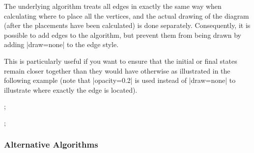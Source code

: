 \documentclass[a4paper,final]{ltxdoc}
\begin{document}
The underlying algorithm treats all edges in exactly the same way when
calculating where to place all the vertices, and the actual drawing of the
diagram (after the placements have been calculated) is done separately.
Consequently, it is possible to add edges to the algorithm, but prevent them
from being drawn by adding |draw=none| to the edge style.

This is particularly useful if you want to ensure that the initial or final
states remain closer together than they would have otherwise as illustrated in
the following example (note that |opacity=0.2| is used instead of |draw=none| to
illustrate where exactly the edge is located).

\begin{codeexample}[]
;
\end{codeexample}
\begin{codeexample}[]
;
\end{codeexample}

\subsubsection{Alternative Algorithms}
\label{subsubsec:alternative_algorithms}
\end{document}

